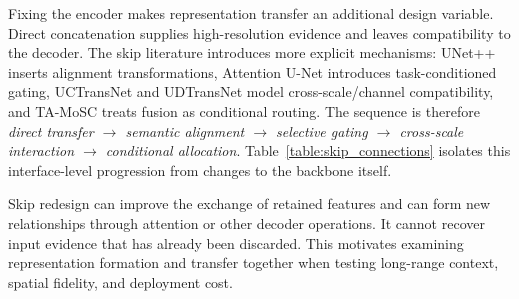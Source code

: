 \documentclass[5p,times,authoryear]{elsarticle}
\begin{document}
Fixing the encoder makes representation transfer an additional design variable. Direct concatenation supplies high-resolution evidence and leaves compatibility to the decoder. The skip literature introduces more explicit mechanisms: UNet++ inserts alignment transformations, Attention U-Net introduces task-conditioned gating, UCTransNet and UDTransNet model cross-scale/channel compatibility, and TA-MoSC treats fusion as conditional routing. The sequence is therefore \emph{direct transfer $\rightarrow$ semantic alignment $\rightarrow$ selective gating $\rightarrow$ cross-scale interaction $\rightarrow$ conditional allocation}. Table~\ref{table:skip_connections} isolates this interface-level progression from changes to the backbone itself.

Skip redesign can improve the exchange of retained features and can form new relationships through attention or other decoder operations. It cannot recover input evidence that has already been discarded. This motivates examining representation formation and transfer together when testing long-range context, spatial fidelity, and deployment cost.
\end{document}
